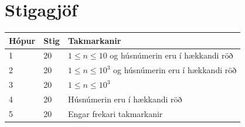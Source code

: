 \section*{Stigagjöf}
\begin{tabular}{|l|l|l|}
\hline
Hópur & Stig & Takmarkanir \\ \hline
1     & 20   & $1 \leq n \leq 10$ og húsnúmerin eru í hækkandi röð\\ \hline
2     & 20   & $1 \leq n \leq 10^3$ og húsnúmerin eru í hækkandi röð\\ \hline
3     & 20   & $1 \leq n \leq 10^3$\\ \hline
4     & 20   & Húsnúmerin eru í hækkandi röð\\ \hline
5     & 20   & Engar frekari takmarkanir\\ \hline
\end{tabular}

